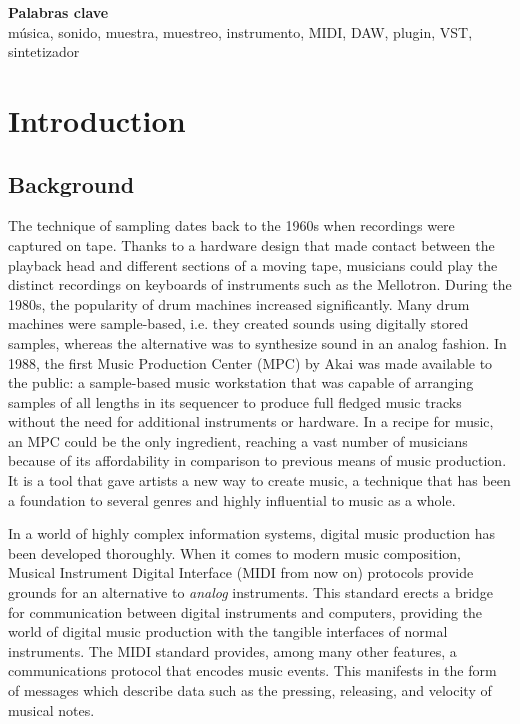 \documentclass[12pt, a4paper, hidelinks]{article}
\begin{document}
	
	\vspace*{\fill}
	\large
	\textbf{Palabras clave}\\
	
	\vspace{-1em}
	\normalsize	
	\noindent música, sonido, muestra, muestreo, instrumento, MIDI, DAW, plugin, VST, sintetizador
	
	
	
	\newpage
	\tableofcontents


	\newpage
	\section{Introduction}
	\subsection{Background}
	The technique of sampling dates back to the 1960s when recordings were captured on tape. Thanks to a hardware design that made contact between the playback head and different sections of a moving tape, musicians could play the distinct recordings on keyboards of instruments such as the Mellotron. During the 1980s, the popularity of drum machines increased significantly. Many drum machines were sample-based, i.e. they created sounds using digitally stored samples, whereas the alternative was to synthesize sound in an analog fashion. In 1988, the first Music Production Center (MPC) by Akai was made available to the public: a sample-based music workstation that was capable of arranging samples of all lengths in its sequencer to produce full fledged music tracks without the need for additional instruments or hardware. In a recipe for music, an MPC could be the only ingredient, reaching a vast number of musicians because of its affordability in comparison to previous means of music production. It is a tool that gave artists a new way to create music, a technique that has been a foundation to several genres and highly influential to music as a whole.\par
 	
 	In a world of highly complex information systems, digital music production has been developed thoroughly. When it comes to modern music composition, Musical Instrument Digital Interface (MIDI from now on) protocols provide grounds for an alternative to \textit{analog} instruments. This standard erects a bridge for communication between digital instruments and computers, providing the world of digital music production with the tangible interfaces of normal instruments. The MIDI standard provides, among many other features, a communications protocol that encodes music events. This manifests in the form of messages which describe data such as the pressing, releasing, and velocity of musical notes. 	
\end{document}
